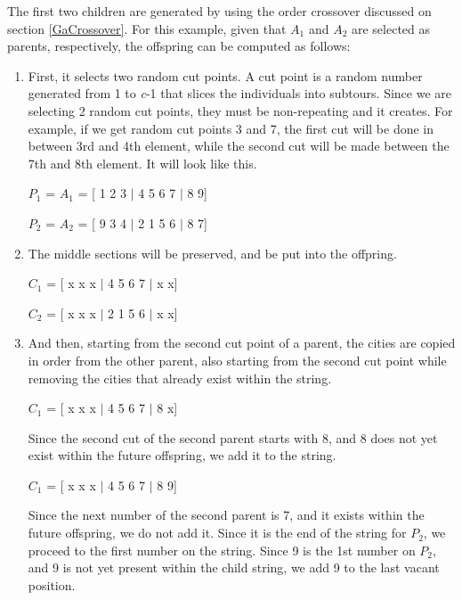 The first two children are generated by using the order crossover discussed on section \ref{GaCrossover}. For this example, given that $A_1$ and $A_2$ are selected as parents, respectively, the offspring can be computed as follows:
\begin{enumerate}
	\item First, it selects two random cut points. A cut point is a random number generated from 1 to \emph{c}-1 that slices the individuals into subtours. Since we are selecting 2 random cut points, they must be non-repeating and it creates. For example, if we get random cut points 3 and 7, the first cut will be done in between 3rd and 4th element, while the second cut will be made between the 7th and 8th element. It will look like this. \par 
	
	\hfill \par
	$P_{1}$ = $A_1$ = [ 1 2 3 $|$ 4 5 6 7 $|$ 8 9] \par 
	$P_{2}$ = $A_2$ = [ 9 3 4 $|$ 2 1 5 6 $|$ 8 7] \par
	
	\hfill \par 
	
	\item The middle sections will be preserved, and be put into the offpring. \par 
	
	\hfill \par 
	$C_{1}$ = [ x x x $|$ 4 5 6 7 $|$ x x] \par 
	$C_{2}$ = [ x x x $|$ 2 1 5 6 $|$ x x] \par 
	\hfill \par
	
	
	\item And then, starting from the second cut point of a parent, the cities are copied in order from the other parent, also starting from the second cut point while removing the cities that already exist within the string. 
	\hfill \par 
	
	\hfill \par 
	$C_{1}$ = [ x x x $|$ 4 5 6 7 $|$ 8 x] \par 
	\hfill \par
	Since the second cut of the second parent starts with 8, and 8 does not yet exist within the future offspring, we add it to the string.
	
	\hfill \par 
	$C_{1}$ = [ x x x $|$ 4 5 6 7 $|$ 8 9] \par 
	\hfill \par
	Since the next number of the second parent is 7, and it exists within the future offspring, we do not add it. Since it is the end of the string for $P_2$, we proceed to  the first number on the string. Since 9 is the 1st number on $P_2$, and 9 is not yet present within the child string, we add 9 to the last vacant position.
	

\end{enumerate}
